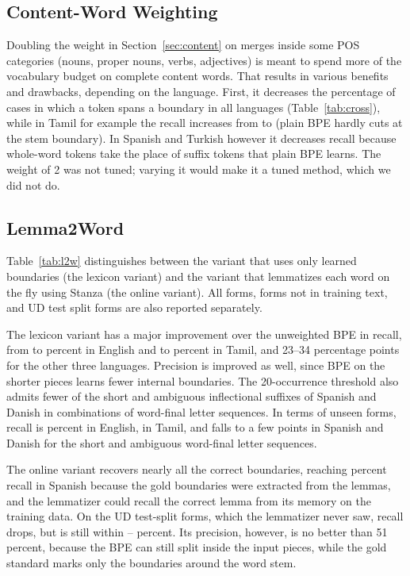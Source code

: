 \subsection{Content-Word Weighting}\label{sec:res-content}
Doubling the weight in Section~\ref{sec:content} on merges inside some POS categories (nouns, proper nouns, verbs, adjectives) is meant to spend more of the vocabulary budget on complete content words.
That results in various benefits and drawbacks, depending on the language.
First, it decreases the percentage of cases in which a token spans a boundary in all languages (Table~\ref{tab:cross}), while in Tamil for example the recall increases from \nRBpeTamil{} to \nRPosContentTamil{} (plain BPE hardly cuts at the stem boundary).
In Spanish and Turkish however it decreases recall because whole-word tokens take the place of suffix tokens that plain BPE learns.
The weight of 2 was not tuned; varying it would make it a tuned method, which we did not do.

\subsection{Lemma2Word}\label{sec:res-l2w}
Table~\ref{tab:l2w} distinguishes between the variant that uses only learned boundaries (the lexicon variant) and the variant that lemmatizes each word on the fly using Stanza (the online variant).
All forms, forms not in training text, and UD test split forms are also reported separately.



The lexicon variant has a major improvement over the unweighted BPE in recall, from \nRBpeEnglish{} to \nLtwLexiconAllREnglish{} percent in English and \nRBpeTamil{} to \nLtwLexiconAllRTamil{} percent in Tamil, and 23--34 percentage points for the other three languages.
Precision is improved as well, since BPE on the shorter pieces learns fewer internal boundaries.
The 20-occurrence threshold also admits fewer of the short and ambiguous inflectional suffixes of Spanish and Danish in combinations of word-final letter sequences.
In terms of unseen forms, recall is \nLtwLexiconUnseenREnglish{} percent in English, \nLtwLexiconUnseenRTamil{} in Tamil, and falls to a few points in Spanish and Danish for the short and ambiguous word-final letter sequences.

The online variant recovers nearly all the correct boundaries, reaching \nLtwOnlineAllRSpanish{} percent recall in Spanish because the gold boundaries were extracted from the lemmas, and the lemmatizer could recall the correct lemma from its memory on the training data.
On the UD test-split forms, which the lemmatizer never saw, recall drops, but is still within \nLtwOnlineTestRDanish--\nLtwOnlineTestRSpanish{} percent.
Its precision, however, is no better than 51 percent, because the BPE can still split inside the input pieces, while the gold standard marks only the boundaries around the word stem.

